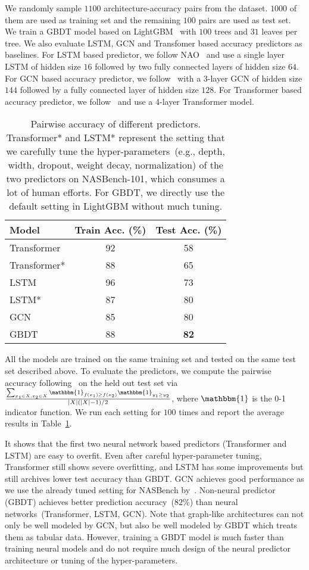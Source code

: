 \documentclass{article}
\begin{document}
We randomly sample $1100$ architecture-accuracy pairs from the dataset. $1000$ of them are used as training set and the remaining $100$ pairs are used as test set. We train a GBDT model based on LightGBM~\cite{lightgbm} with $100$ trees and $31$ leaves per tree. We also evaluate LSTM, GCN and Transfomer based accuracy predictors as baselines. For LSTM based predictor, we follow NAO~\cite{nao} and use a single layer LSTM of hidden size $16$ followed by two fully connected layers of hidden size $64$. For GCN based accuracy predictor, we follow~\cite{neuralpredictor} with a 3-layer GCN of hidden size $144$ followed by a fully connected layer of hidden size $128$. For Transformer based accuracy predictor, we follow~\cite{transformer} and use a 4-layer Transformer model.
\begin{table}
\centering
\caption{Pairwise accuracy of different predictors. Transformer* and LSTM* represent the setting that we carefully tune the hyper-parameters~(e.g., depth, width, dropout, weight decay, normalization) of the two predictors on NASBench-101, which consumes a lot of human efforts. For GBDT, we directly use the default setting in LightGBM without much tuning.}
\label{tbl:nasbench:acc}
\begin{tabular}{lcc}
\toprule
Model  & Train Acc. (\%) & Test Acc. (\%)\\
\midrule
Transformer & 92 & 58\\
Transformer* & 88 & 65\\
LSTM & 96 & 73 \\
LSTM* & 87 & 80\\
GCN & 85 & 80\\
\midrule
GBDT & 88 & \textbf{82}\\
\bottomrule
\end{tabular}
\end{table}

All the models are trained on the same training set and tested on the same test set described above. To evaluate the predictors, we compute the pairwise accuracy following~\cite{nao} on the held out test set via $\frac{\sum_{x_1\in X, x_2\in X}\mathbbm{1}_{f(x_1)\geq f(x_2)}\mathbbm{1}_{y_1\geq y_2}}{|X|(|X|-1)/2}$, where $\mathbbm{1}$ is the 0-1 indicator function. We run each setting for $100$ times and report the average results in Table~\ref{tbl:nasbench:acc}. 

It shows that the first two neural network based predictors (Transformer and LSTM) are easy to overfit. Even after careful hyper-parameter tuning, Transformer still shows severe overfitting, and LSTM has some improvements but still archives lower test accuracy than GBDT. GCN achieves good performance as we use the already tuned setting for NASBench by~\cite{neuralpredictor}. Non-neural predictor (GBDT) achieves better prediction accuracy~($82\%$) than neural networks~(Transformer, LSTM, GCN). Note that graph-like architectures can not only be well modeled by GCN, but also be well modeled by GBDT which treats them as tabular data. However, training a GBDT model is much faster than training neural models and do not require much design of the neural predictor architecture or tuning of the hyper-parameters.
\end{document}
